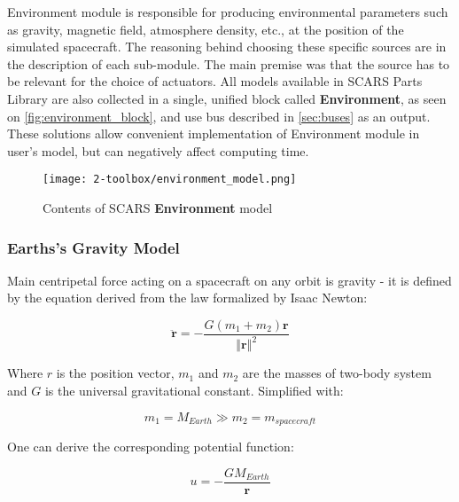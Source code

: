     Environment module is responsible for producing environmental parameters such as gravity, magnetic field, atmosphere density, etc., at the position of the simulated spacecraft. The reasoning behind choosing these specific sources are in the description of each sub-module. The main premise was that the source has to be relevant for the choice of actuators. All models available in SCARS Parts Library are also collected in a single, unified block called \textbf{Environment}, as seen on \autoref{fig:environment_block}, and use bus described in \autoref{sec:buses} as an output. These solutions allow convenient implementation of Environment module in user's model, but can negatively affect computing time.

    \begin{figure}[H]
        \centering
        \texttt{[image: 2-toolbox/environment\_model.png]}
        \caption{Contents of SCARS \textbf{Environment} model}
        \label{fig:environment_block}
    \end{figure}

        
    \subsubsection{Earths's Gravity Model}
        Main centripetal force acting on a spacecraft on any orbit is gravity - it is defined by the equation derived from the law formalized by Isaac Newton:

        \begin{equation}
            \ddot{\textbf{r}} = -\frac{G(m_1+m_2)\textbf{r}}{\left\Vert \textbf{r} \right\Vert^2}
        \end{equation}

        Where $r$ is the position vector, $m_1$ and $m_2$ are the masses of two-body system and $G$ is the universal gravitational constant. Simplified with:

        \begin{equation}
            m_1 = M_{Earth} \gg m_2 = m_{spacecraft}
        \end{equation}

        One can derive the corresponding potential function:
        
        \begin{equation}
            u = -\frac{GM_{Earth}}{\textbf{r}}\label{eq:pot}
        \end{equation}


